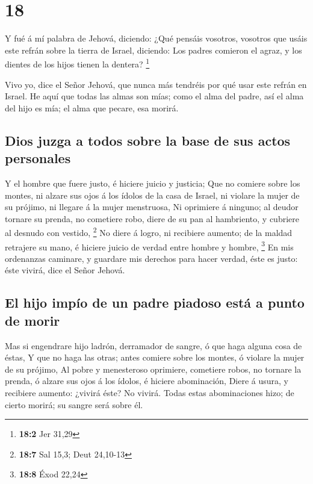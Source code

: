 \hypertarget{section-17}{%
\section{18}\label{section-17}}

 Y fué á mí palabra de Jehová, diciendo:  ¿Qué
pensáis vosotros, vosotros que usáis este refrán sobre la tierra de
Israel, diciendo: Los padres comieron el agraz, y los dientes de los
hijos tienen la dentera? \footnote{\textbf{18:2} Jer 31,29}

 Vivo yo, dice el Señor Jehová, que nunca más tendréis por
qué usar este refrán en Israel.  He aquí que todas las almas
son mías; como el alma del padre, así el alma del hijo es mía; el alma
que pecare, esa morirá.

\hypertarget{dios-juzga-a-todos-sobre-la-base-de-sus-actos-personales}{%
\subsection{Dios juzga a todos sobre la base de sus actos
personales}\label{dios-juzga-a-todos-sobre-la-base-de-sus-actos-personales}}

 Y el hombre que fuere justo, é hiciere juicio y justicia;
 Que no comiere sobre los montes, ni alzare sus ojos á los
ídolos de la casa de Israel, ni violare la mujer de su prójimo, ni
llegare á la mujer menstruosa,  Ni oprimiere á ninguno; al
deudor tornare su prenda, no cometiere robo, diere de su pan al
hambriento, y cubriere al desnudo con vestido, \footnote{\textbf{18:7}
  Sal 15,3; Deut 24,10-13}  No diere á logro, ni recibiere
aumento; de la maldad retrajere su mano, é hiciere juicio de verdad
entre hombre y hombre, \footnote{\textbf{18:8} Éxod 22,24} 
En mis ordenanzas caminare, y guardare mis derechos para hacer verdad,
éste es justo: éste vivirá, dice el Señor Jehová.

\hypertarget{el-hijo-impuxedo-de-un-padre-piadoso-estuxe1-a-punto-de-morir}{%
\subsection{El hijo impío de un padre piadoso está a punto de
morir}\label{el-hijo-impuxedo-de-un-padre-piadoso-estuxe1-a-punto-de-morir}}

 Mas si engendrare hijo ladrón, derramador de sangre, ó que
haga alguna cosa de éstas,  Y que no haga las otras; antes
comiere sobre los montes, ó violare la mujer de su prójimo,
 Al pobre y menesteroso oprimiere, cometiere robos, no
tornare la prenda, ó alzare sus ojos á los ídolos, é hiciere
abominación,  Diere á usura, y recibiere aumento: ¿vivirá
éste? No vivirá. Todas estas abominaciones hizo; de cierto morirá; su
sangre será sobre él.

